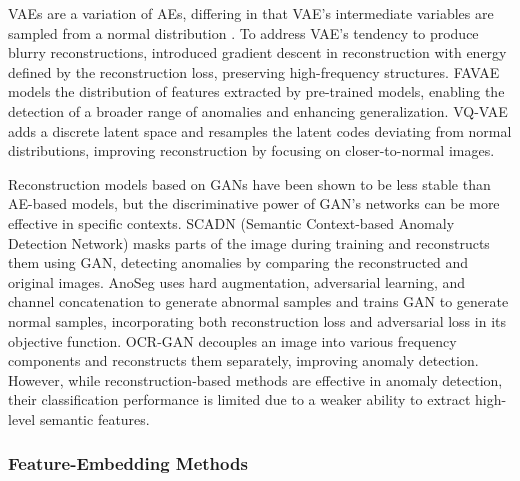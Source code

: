 VAEs are a variation of AEs, differing in that VAE's intermediate variables are sampled from a normal distribution \cite{liu2020towards, dehaene2020iterative}. To address VAE's tendency to produce blurry reconstructions, \cite{dehaene2020iterative} introduced gradient descent in reconstruction with energy defined by the reconstruction loss, preserving high-frequency structures. FAVAE \cite{dehaene2020anomaly} models the distribution of features extracted by pre-trained models, enabling the detection of a broader range of anomalies and enhancing generalization. VQ-VAE \cite{wang2020image} adds a discrete latent space and resamples the latent codes deviating from normal distributions, improving reconstruction by focusing on closer-to-normal images. 

Reconstruction models based on GANs have been shown to be less stable than AE-based models, but the discriminative power of GAN’s networks can be more effective in specific contexts. SCADN (Semantic Context-based Anomaly Detection Network) \cite{yan2021learning} masks parts of the image during training and reconstructs them using GAN, detecting anomalies by comparing the reconstructed and original images. AnoSeg \cite{song2021anoseg} uses hard augmentation, adversarial learning, and channel concatenation to generate abnormal samples and trains GAN to generate normal samples, incorporating both reconstruction loss and adversarial loss in its objective function. OCR-GAN \cite{liang2023omni} decouples an image into various frequency components and reconstructs them separately, improving anomaly detection. However, while reconstruction-based methods are effective in anomaly detection, their classification performance is limited due to a weaker ability to extract high-level semantic features.

\subsubsection*{Feature-Embedding Methods}


